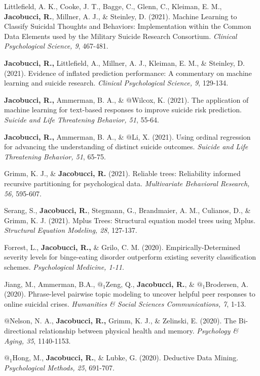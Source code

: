 \documentclass[letterpaper,10pt]{article}
\begin{document}
\begin{etaremune}
	\item Littlefield, A. K., Cooke, J. T., Bagge, C., Glenn, C., Kleiman, E. M., \textbf{Jacobucci, R.}, Millner, A. J., \& Steinley, D. (2021). Machine Learning to Classify Suicidal Thoughts and Behaviors: Implementation within the Common Data Elements used by the Military Suicide Research Consortium. \emph{Clinical Psychological Science, 9}, 467-481.
	\item \textbf{Jacobucci, R.,} Littlefield, A., Millner, A. J., Kleiman, E. M., \& Steinley, D. (2021). Evidence of inflated prediction performance: A commentary on machine learning and suicide research. \emph{Clinical Psychological Science, 9}, 129-134.
	\item \textbf{Jacobucci, R.,} Ammerman, B. A., \& $@$Wilcox, K. (2021). The application of machine learning for text-based responses to improve suicide risk prediction. \emph{Suicide and Life Threatening Behavior, 51}, 55-64.
	\item \textbf{Jacobucci, R.,} Ammerman, B. A., \& $@$Li, X. (2021). Using ordinal regression for advancing the understanding of distinct suicide outcomes. \emph{Suicide and Life Threatening Behavior, 51}, 65-75.
	\item Grimm, K. J., \& \textbf{Jacobucci, R.} (2021). Reliable trees: Reliability informed recursive partitioning for psychological data. \emph{Multivariate Behavioral Research, 56,} 595-607.
	\item  Serang, S., \textbf{Jacobucci, R.}, Stegmann, G., Brandmaier, A. M., Culianos, D., \& Grimm, K. J. (2021). Mplus Trees: Structural equation model trees using Mplus. \emph{Structural Equation Modeling, 28}, 127-137.
		\item Forrest, L., \textbf{Jacobucci, R.,} \& Grilo, C. M. (2020). Empirically-Determined severity levels for binge-eating disorder outperform existing severity classification schemes. \emph{Psychological Medicine, 1-11}.
		\item Jiang, M., Ammerman, B.A., $@_1$Zeng, Q., \textbf{Jacobucci, R.}, \& $@_1$Brodersen, A. (2020). Phrase-level pairwise topic modeling to uncover helpful peer responses to online suicidal crises. \emph{Humanities \& Social Sciences Communications, 7}, 1-13.
	\item $@$Nelson, N. A., \textbf{Jacobucci, R.,} Grimm, K. J., \& Zelinski, E. (2020). The Bi-directional relationship between physical health and memory. \emph{Psychology \& Aging, 35}, 1140-1153.
	\item  $@_1$Hong, M., \textbf{Jacobucci, R.}, \& Lubke, G. (2020). Deductive Data Mining. \emph{Psychological Methods, 25}, 691-707.

\end{etaremune}
\end{document}
